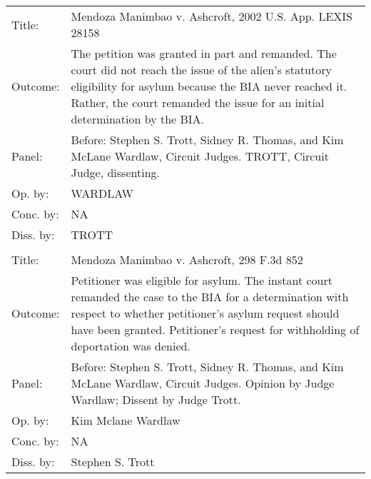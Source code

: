 \documentclass[10pt, letterpaper]{article}
\begin{document}
\begin{spacing}{1.0}
\begin{footnotesize}
\begin{longtable}[H]{lp{6in}}
        Title: & Mendoza Manimbao v. Ashcroft, 2002 U.S. App. LEXIS 28158\\[2pt]
        Outcome: & The petition was granted in part and remanded. The court did not reach the issue of the alien's statutory eligibility for asylum because the BIA never reached it. Rather, the court remanded the issue for an initial determination by the BIA.\\[2pt]
        Panel: & Before: Stephen S. Trott, Sidney R. Thomas, and Kim McLane Wardlaw, Circuit Judges. TROTT, Circuit Judge, dissenting.  \\[2pt]
        Op. by: & WARDLAW\\[2pt]
        Conc. by: & NA\\[2pt]
        Diss. by: & TROTT\\[2pt]
        \arrayrulecolor{gray}\hline\\[-4pt]
        Title: & Mendoza Manimbao v. Ashcroft, 298 F.3d 852\\[2pt]
        Outcome: & Petitioner was eligible for asylum. The instant court remanded the case to the BIA for a determination with respect to whether petitioner's asylum request should have been granted. Petitioner's request for withholding of deportation was denied.\\[2pt]
        Panel: & Before: Stephen S. Trott, Sidney R. Thomas, and Kim McLane Wardlaw, Circuit Judges. Opinion by Judge Wardlaw; Dissent by Judge Trott.  \\[2pt]
        Op. by: & Kim Mclane Wardlaw \\[2pt]
        Conc. by: & NA\\[2pt]
        Diss. by: & Stephen S. Trott\\[2pt]
        

\end{longtable}
\end{footnotesize}
\end{spacing}
\end{document}
